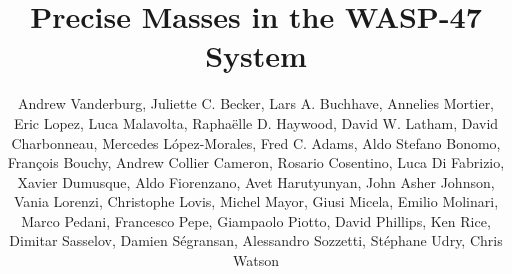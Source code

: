 \documentclass{emulateapj}
\begin{document}

\title{Precise Masses in the WASP-47 System}
\author{Andrew Vanderburg,
Juliette C. Becker,
Lars A. Buchhave,
Annelies Mortier,
Eric Lopez,  
Luca Malavolta,
Rapha\"{e}lle D. Haywood,
David W. Latham,
David Charbonneau,
Mercedes L\'opez-Morales,
Fred C. Adams,
Aldo Stefano Bonomo,
Fran\c{c}ois Bouchy,
Andrew Collier Cameron, 
Rosario Cosentino,
Luca Di Fabrizio,
Xavier Dumusque,
Aldo Fiorenzano,
Avet Harutyunyan,
John Asher Johnson,
Vania Lorenzi,
Christophe Lovis, 
Michel Mayor,
Giusi Micela,
Emilio Molinari,
Marco Pedani,
Francesco Pepe, 
Giampaolo Piotto,
David Phillips,
Ken Rice,
Dimitar Sasselov,
Damien S\'egransan,
Alessandro Sozzetti,
St\'ephane Udry,
Chris Watson
}

\end{document}
